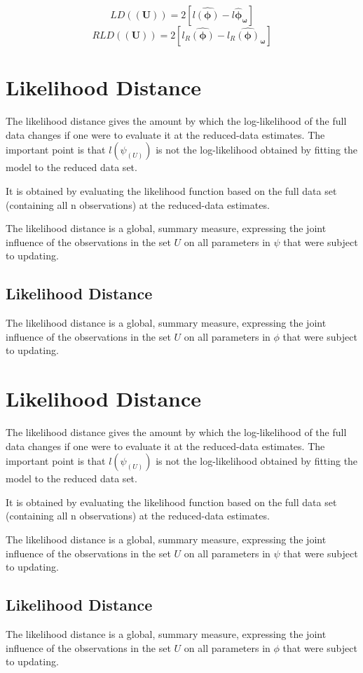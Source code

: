 \documentclass[12pt, a4paper]{article}
\begin{document}
\[  LD(\boldsymbol{(U)})= 2[l\boldsymbol{\hat{(\phi)}} - l\boldsymbol{\hat{\phi}_\omega} ] \]
\[  RLD(\boldsymbol{(U)})= 2[ l_R\boldsymbol{\hat{(\phi)}} - l_R\boldsymbol{\hat{(\phi)}_\omega} ] \]

\newpage
\section{Likelihood Distance} %
The likelihood distance gives the amount by which the log-likelihood of the full data changes if one were
to evaluate it at the reduced-data estimates. The important point is that $l(\psi_{(U)})$ is not the log-likelihood
obtained by fitting the model to the reduced data set.

It is obtained by evaluating the likelihood function based on the full data set (containing all n observations) at the reduced-data estimates.

The likelihood distance is a global, summary measure, expressing the joint influence of the observations in
the set $U$ on all parameters in $\psi$  that were subject to updating.

\subsection{Likelihood Distance}

The  likelihood distance is a global, summary measure, expressing the joint influence of the observations in the set $U$ on all parameters in $\phi$  that were subject to updating.




\newpage
\section{Likelihood Distance} %
The likelihood distance gives the amount by which the log-likelihood of the full data changes if one were
to evaluate it at the reduced-data estimates. The important point is that $l(\psi_{(U)})$ is not the log-likelihood
obtained by fitting the model to the reduced data set.

It is obtained by evaluating the likelihood function based on the full data set (containing all n observations) at the reduced-data estimates.

The likelihood distance is a global, summary measure, expressing the joint influence of the observations in
the set $U$ on all parameters in $\psi$  that were subject to updating.

\subsection{Likelihood Distance}

The  likelihood distance is a global, summary measure, expressing the joint influence of the observations in the set $U$ on all parameters in $\phi$  that were subject to updating.
\end{document}
